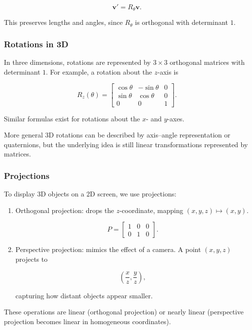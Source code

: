 \documentclass[
  12pt,
  a4paper,
]{article}
\begin{document}
\[\mathbf{v}' = R_\theta \mathbf{v}.\]

This preserves lengths and angles, since \(R_\theta\) is orthogonal with
determinant \(1\).

\subsubsection{Rotations in 3D}\label{rotations-in-3d}

In three dimensions, rotations are represented by \(3 \times 3\)
orthogonal matrices with determinant \(1\). For example, a rotation
about the \(z\)-axis is

\[R_z(\theta) = 
\begin{bmatrix}
\cos\theta & -\sin\theta & 0 \\
\sin\theta & \cos\theta & 0 \\
0 & 0 & 1
\end{bmatrix}.\]

Similar formulas exist for rotations about the \(x\)- and \(y\)-axes.

More general 3D rotations can be described by axis--angle representation
or quaternions, but the underlying idea is still linear transformations
represented by matrices.

\subsubsection{Projections}\label{projections-2}

To display 3D objects on a 2D screen, we use projections:

\begin{enumerate}
\def\labelenumi{\arabic{enumi}.}
\item
  Orthogonal projection: drops the \(z\)-coordinate, mapping
  \((x,y,z) \mapsto (x,y)\).

  \[P = \begin{bmatrix}
  1 & 0 & 0 \\
  0 & 1 & 0
  \end{bmatrix}.\]
\item
  Perspective projection: mimics the effect of a camera. A point
  \((x,y,z)\) projects to

  \[\left(\frac{x}{z}, \frac{y}{z}\right),\]

  capturing how distant objects appear smaller.
\end{enumerate}

These operations are linear (orthogonal projection) or nearly linear
(perspective projection becomes linear in homogeneous coordinates).
\end{document}
